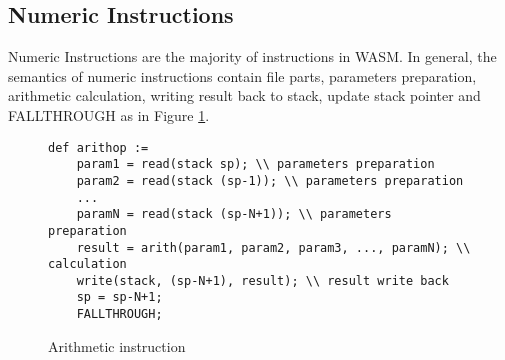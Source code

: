 \subsection{Numeric Instructions}
\label{chp:numeric-instruction}
Numeric Instructions are the majority of instructions in WASM. In general, the semantics of numeric instructions contain file parts, parameters preparation, arithmetic calculation, writing result back to stack, update stack pointer and FALLTHROUGH as in Figure \ref{fig:ins-arith}.
\begin{figure}[h!]
\small
\centering
\begin{verbatim}
def arithop :=
    param1 = read(stack sp); \\ parameters preparation
    param2 = read(stack (sp-1)); \\ parameters preparation
    ...
    paramN = read(stack (sp-N+1)); \\ parameters preparation
    result = arith(param1, param2, param3, ..., paramN); \\ calculation
    write(stack, (sp-N+1), result); \\ result write back
    sp = sp-N+1;
    FALLTHROUGH;
\end{verbatim}
\caption{Arithmetic instruction}
\label{fig:ins-arith}
\end{figure}

